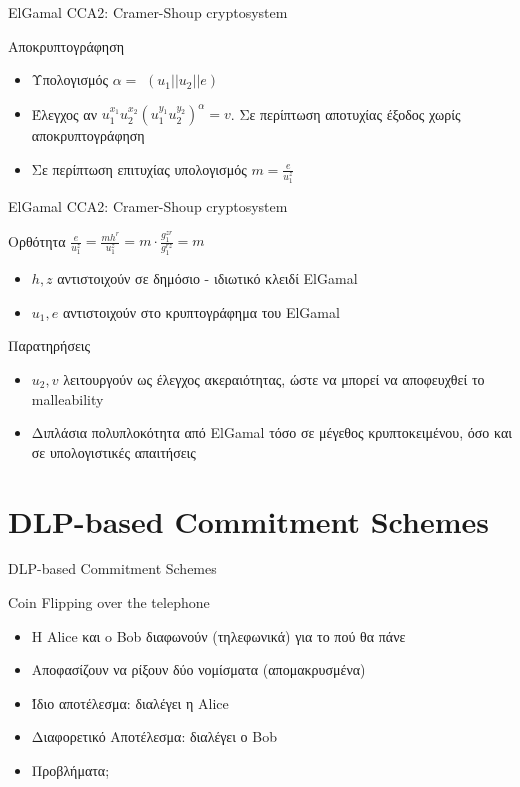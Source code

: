 \documentclass[handout]{beamer}
\begin{document}
\begin{frame}{ElGamal CCA2: Cramer-Shoup cryptosystem} 
\begin{block}{Αποκρυπτογράφηση}
\begin{itemize}
\item Υπολογισμός $\alpha = $ \hash$(u_1||u_2||e)$ \pause
\item Έλεγχος αν $u_1^{x_1}u_2^{x_2}(u_1^{y_1}u_2^{y_2})^\alpha=v$. Σε περίπτωση αποτυχίας έξοδος χωρίς αποκρυπτογράφηση \pause
\item Σε περίπτωση επιτυχίας υπολογισμός $m = \frac{e}{u_1^z}$
\end{itemize}
\end{block}
\end{frame}

\begin{frame}{ElGamal CCA2: Cramer-Shoup cryptosystem}
\begin{block}{Ορθότητα}
$\frac{e}{u_1^z} = \frac{mh^r}{u_1^z} = m \cdot \frac{g_1^{zr}}{g_1^{rz}} = m$
\begin{itemize}
\item $h,z$ αντιστοιχούν σε δημόσιο - ιδιωτικό κλειδί  ElGamal \pause
\item $u_1, e$ αντιστοιχούν στο κρυπτογράφημα του ElGamal 
\end{itemize}
\end{block}
\pause
\begin{block}{Παρατηρήσεις}
\begin{itemize}
\item $u_2,v$ λειτουργούν ως έλεγχος ακεραιότητας, ώστε να  μπορεί να αποφευχθεί το malleability \pause
\item Διπλάσια πολυπλοκότητα από ElGamal τόσο σε μέγεθος κρυπτοκειμένου, όσο και σε υπολογιστικές απαιτήσεις
\end{itemize}
\end{block}
\end{frame}

\section{DLP-based Commitment Schemes}
\begin{frame}{DLP-based Commitment Schemes}
\begin{block}{Coin Flipping over the telephone}
\begin{itemize}
\item Η Alice και o Bob διαφωνούν (τηλεφωνικά) για το πού θα πάνε
\pause
\item Αποφασίζουν να ρίξουν δύο νομίσματα (απομακρυσμένα)
\pause
\item Ίδιο αποτέλεσμα: διαλέγει η Alice
\pause
\item Διαφορετικό Αποτέλεσμα: διαλέγει ο Bob
\pause
\item Προβλήματα;
\end{itemize}
\end{block}
\end{frame}
\end{document}

